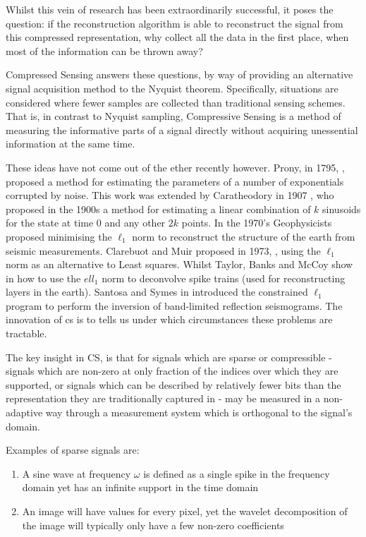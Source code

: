 Whilst this vein of research has been extraordinarily successful, it poses the question: if the reconstruction algorithm is able to reconstruct the signal from this compressed representation, why collect all the data in the first place, when most of the information can be thrown away? 

Compressed Sensing answers these questions, by way of providing an alternative signal acquisition method to the Nyquist theorem. Specifically, situations are considered where fewer samples are collected than traditional sensing schemes. That is, in contrast to Nyquist sampling, Compressive Sensing is a method of measuring the informative parts of a signal directly without acquiring unessential information at the same time. 

These ideas have not come out of the ether recently however. Prony, in 1795, \cite{prony1795essai}, proposed a method for estimating the parameters of a number of exponentials corrupted by noise. This work was extended by Caratheodory in 1907 \cite{Caratheodory1907}, who proposed in the 1900s a method for estimating a linear combination of \(k\) sinusoids for the state at time \(0\) and any other \(2k\) points. In the 1970's Geophysicists proposed minimising the \(\ell_1\) norm to reconstruct the structure of the earth from seismic measurements. Clarebuot and Muir proposed in 1973, \cite{claerbout1973robust}, using the \(\ell_1\) norm as an alternative to Least squares. Whilst Taylor, Banks and McCoy show in \cite{taylor1979deconvolution} how to use the \(ell_1\) norm to deconvolve spike trains (used for reconstructing layers in the earth). Santosa and Symes in \cite{Santosa1986} introduced the constrained \(\ell_1\) program to perform the inversion of band-limited reflection seismograms. The  innovation of \gls{cs} is to tells us under which circumstances these problems are tractable.

The key insight in CS, is that for signals which are sparse or  compressible - signals which are non-zero at only fraction of the indices over which they are supported, or signals which can be described by relatively fewer bits than the representation they are traditionally captured in - may be measured in a non-adaptive way through a measurement system which is orthogonal to the signal's domain. 

Examples of sparse signals are: 

\begin{enumerate}
\item  A sine wave at frequency \(\omega\) is defined as a single spike in the frequency domain yet has an infinite support in the time domain
\item An image will have values for every pixel, yet the wavelet decomposition of the image will typically only have a few non-zero coefficients
\end{enumerate} 

